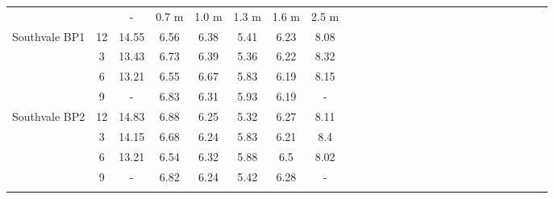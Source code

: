 \begin{table}[h]
{\begin{tabular}{l|l|l|l|l|l|l|lllllllllllllllllll}
			\cline{1-8}
			\multicolumn{1}{c|}{} & \multicolumn{1}{c|}{} & \multicolumn{1}{c|}{-} & \multicolumn{1}{c|}{0.7 m} & \multicolumn{1}{c|}{1.0 m} & \multicolumn{1}{c|}{1.3 m} & \multicolumn{1}{c|}{1.6 m} & \multicolumn{1}{c}{2.5 m} &  &  &  &  &  &  &  &  &  &  &  &  &  &  &  &  &  &  \\ 
			\cline{1-8}
			\multicolumn{1}{c|}{Southvale BP1} & \multicolumn{1}{c|}{12} & \multicolumn{1}{c|}{14.55} & \multicolumn{1}{c|}{6.56} & \multicolumn{1}{c|}{6.38} & \multicolumn{1}{c|}{5.41} & \multicolumn{1}{c|}{6.23} & \multicolumn{1}{c}{8.08} &  &  &  &  &  &  &  &  &  &  &  &  &  &  &  &  &  &  \\ 
			\multicolumn{1}{c|}{} & \multicolumn{1}{c|}{3} & \multicolumn{1}{c|}{13.43} & \multicolumn{1}{c|}{6.73} & \multicolumn{1}{c|}{6.39} & \multicolumn{1}{c|}{5.36} & \multicolumn{1}{c|}{6.22} & \multicolumn{1}{c}{8.32} &  &  &  &  &  &  &  &  &  &  &  &  &  &  &  &  &  &  \\ 
			\multicolumn{1}{c|}{} & \multicolumn{1}{c|}{6} & \multicolumn{1}{c|}{13.21} & \multicolumn{1}{c|}{6.55} & \multicolumn{1}{c|}{6.67} & \multicolumn{1}{c|}{5.83} & \multicolumn{1}{c|}{6.19} & \multicolumn{1}{c}{8.15} &  &  &  &  &  &  &  &  &  &  &  &  &  &  &  &  &  &  \\ 
			\multicolumn{1}{c|}{} & \multicolumn{1}{c|}{9} & \multicolumn{1}{c|}{-} & \multicolumn{1}{c|}{6.83} & \multicolumn{1}{c|}{6.31} & \multicolumn{1}{c|}{5.93} & \multicolumn{1}{c|}{6.19} & \multicolumn{1}{c}{-} &  &  &  &  &  &  &  &  &  &  &  &  &  &  &  &  &  &  \\ 
			\cline{1-8}
			\multicolumn{1}{c|}{Southvale BP2} & \multicolumn{1}{c|}{12} & \multicolumn{1}{c|}{14.83} & \multicolumn{1}{c|}{6.88} & \multicolumn{1}{c|}{6.25} & \multicolumn{1}{c|}{5.32} & \multicolumn{1}{c|}{6.27} & \multicolumn{1}{c}{8.11} &  &  &  &  &  &  &  &  &  &  &  &  &  &  &  &  &  &  \\ 
			\multicolumn{1}{c|}{} & \multicolumn{1}{c|}{3} & \multicolumn{1}{c|}{14.15} & \multicolumn{1}{c|}{6.68} & \multicolumn{1}{c|}{6.24} & \multicolumn{1}{c|}{5.83} & \multicolumn{1}{c|}{6.21} & \multicolumn{1}{c}{8.4} &  &  &  &  &  &  &  &  &  &  &  &  &  &  &  &  &  &  \\ 
			\multicolumn{1}{c|}{} & \multicolumn{1}{c|}{6} & \multicolumn{1}{c|}{13.21} & \multicolumn{1}{c|}{6.54} & \multicolumn{1}{c|}{6.32} & \multicolumn{1}{c|}{5.88} & \multicolumn{1}{c|}{6.5} & \multicolumn{1}{c}{8.02} &  &  &  &  &  &  &  &  &  &  &  &  &  &  &  &  &  &  \\ 
			\multicolumn{1}{c|}{} & \multicolumn{1}{c|}{9} & \multicolumn{1}{c|}{-} & \multicolumn{1}{c|}{6.82} & \multicolumn{1}{c|}{6.24} & \multicolumn{1}{c|}{5.42} & \multicolumn{1}{c|}{6.28} & \multicolumn{1}{c}{-} &  &  &  &  &  &  &  &  &  &  &  &  &  &  &  &  &  &  \\ 
			\cline{1-8}
			\multicolumn{1}{l}{} & \multicolumn{1}{l}{} & \multicolumn{1}{l}{} & \multicolumn{1}{l}{} & \multicolumn{1}{l}{} & \multicolumn{1}{l}{} & \multicolumn{1}{l}{} &  &  &  &  &  &  &  &  &  &  &  &  &  &  &  &  &  &  &  \\ 
		\end{tabular}
		
}
\end{table}
